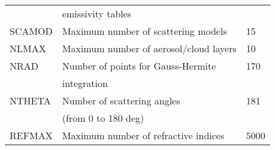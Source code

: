 \begin{table*}[!h]
{\begin{tabular}{|l|l|l|}
         & emissivity tables                             & \\ 
SCAMOD   & Maximum number of scattering models           & 15 \\
NLMAX    & Maximum number of aerosol/cloud layers        & 10 \\
NRAD     & Number of points for Gauss-Hermite            & 170 \\
         & integration                                   & \\
NTHETA   & Number of scattering angles                   & 181 \\
         & (from 0 to 180 deg)                           & \\
REFMAX   & Maximum number of refractive indices          & 5000 \\
\hline
\end{tabular}}
\end{table*} 



